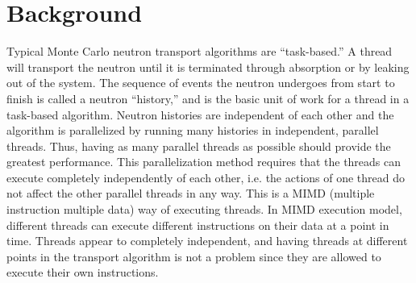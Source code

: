 \documentclass[preprint,12pt]{elsarticle}
\begin{document}
\section{Background}
\label{sec:background}

Typical Monte Carlo neutron transport algorithms are ``task-based.''  A thread will transport the neutron until it is terminated through absorption or by leaking out of the system.  The sequence of events the neutron undergoes from start to finish is called a neutron ``history,'' and is the basic unit of work for a thread in a task-based algorithm.  Neutron histories are independent of each other and the algorithm is parallelized by running many histories in independent, parallel threads.  Thus, having as many parallel threads as possible should provide the greatest performance.  This parallelization method requires that the threads can execute completely independently of each other, i.e. the actions of one thread do not affect the other parallel threads in any way.  This is a MIMD (multiple instruction multiple data) way of executing threads.  In MIMD execution model, different threads can execute different instructions on their data at a point in time.  Threads appear to completely independent, and having threads at different points in the transport algorithm is not a problem since they are allowed to execute their own instructions.
\end{document}
